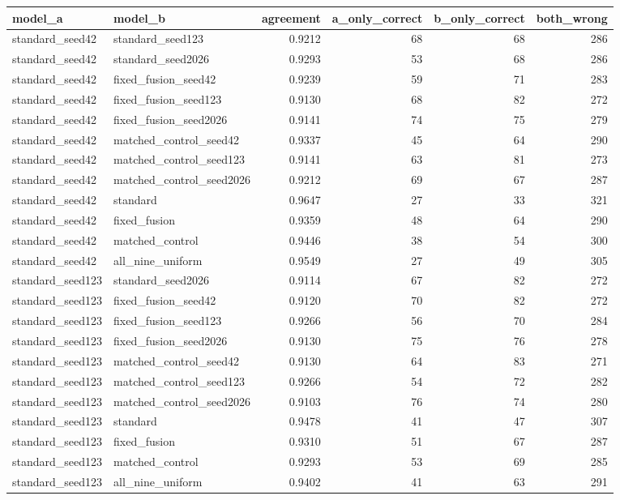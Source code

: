 \begin{tabular}{llrrrr}
\toprule
model\_a & model\_b & agreement & a\_only\_correct & b\_only\_correct & both\_wrong \\
\midrule
standard\_seed42 & standard\_seed123 & 0.9212 & 68 & 68 & 286 \\
standard\_seed42 & standard\_seed2026 & 0.9293 & 53 & 68 & 286 \\
standard\_seed42 & fixed\_fusion\_seed42 & 0.9239 & 59 & 71 & 283 \\
standard\_seed42 & fixed\_fusion\_seed123 & 0.9130 & 68 & 82 & 272 \\
standard\_seed42 & fixed\_fusion\_seed2026 & 0.9141 & 74 & 75 & 279 \\
standard\_seed42 & matched\_control\_seed42 & 0.9337 & 45 & 64 & 290 \\
standard\_seed42 & matched\_control\_seed123 & 0.9141 & 63 & 81 & 273 \\
standard\_seed42 & matched\_control\_seed2026 & 0.9212 & 69 & 67 & 287 \\
standard\_seed42 & standard & 0.9647 & 27 & 33 & 321 \\
standard\_seed42 & fixed\_fusion & 0.9359 & 48 & 64 & 290 \\
standard\_seed42 & matched\_control & 0.9446 & 38 & 54 & 300 \\
standard\_seed42 & all\_nine\_uniform & 0.9549 & 27 & 49 & 305 \\
standard\_seed123 & standard\_seed2026 & 0.9114 & 67 & 82 & 272 \\
standard\_seed123 & fixed\_fusion\_seed42 & 0.9120 & 70 & 82 & 272 \\
standard\_seed123 & fixed\_fusion\_seed123 & 0.9266 & 56 & 70 & 284 \\
standard\_seed123 & fixed\_fusion\_seed2026 & 0.9130 & 75 & 76 & 278 \\
standard\_seed123 & matched\_control\_seed42 & 0.9130 & 64 & 83 & 271 \\
standard\_seed123 & matched\_control\_seed123 & 0.9266 & 54 & 72 & 282 \\
standard\_seed123 & matched\_control\_seed2026 & 0.9103 & 76 & 74 & 280 \\
standard\_seed123 & standard & 0.9478 & 41 & 47 & 307 \\
standard\_seed123 & fixed\_fusion & 0.9310 & 51 & 67 & 287 \\
standard\_seed123 & matched\_control & 0.9293 & 53 & 69 & 285 \\
standard\_seed123 & all\_nine\_uniform & 0.9402 & 41 & 63 & 291 \\

\end{tabular}
